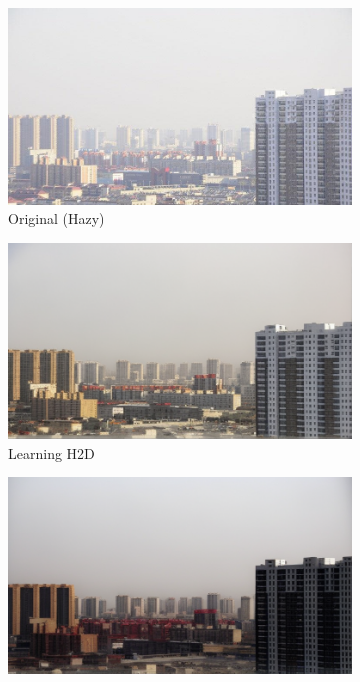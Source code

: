 \documentclass{article}
\begin{document}
\begin{figure}[t]
\begin{subfigure}[b]{0.32\textwidth}
    \centering
    \includegraphics[width=\textwidth]{examples_original/3.png}
    \caption{Original (Hazy)}
\end{subfigure}
\hfill
\begin{subfigure}[b]{0.32\textwidth}
    \centering
    \includegraphics[width=\textwidth]{examples_baseline/3.png}
    \caption{Learning H2D}
\end{subfigure}
\hfill
\begin{subfigure}[b]{0.32\textwidth}
    \centering
    \includegraphics[width=\textwidth]{examples_ours/3_isr_adaptive.png}

\end{subfigure}
\end{figure}
\end{document}

